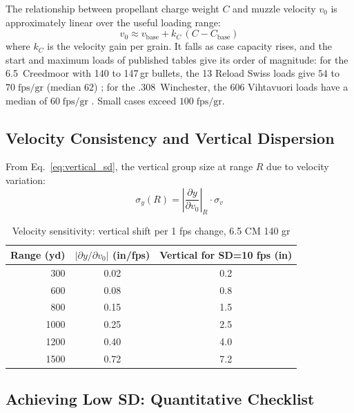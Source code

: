 \documentclass[11pt,twoside,openright]{report}
\begin{document}
The relationship between propellant charge weight $C$ and muzzle velocity $v_0$ is approximately linear over the useful loading range:
\begin{equation}
  v_0 \approx v_{\mathrm{base}} + k_C\,(C - C_{\mathrm{base}})
  \label{eq:charge_vel_linear}
\end{equation}
where $k_C$ is the velocity gain per grain. It falls as case capacity rises, and the start and maximum loads of published tables give its order of magnitude: for the 6.5~Creedmoor with 140 to 147\,gr bullets, the 13 Reload Swiss loads give $54$ to $70\;\text{fps/gr}$ (median $62$) \citep{reloadswiss2025}; for the .308~Winchester, the 606 Vihtavuori loads have a median of $60\;\text{fps/gr}$ \citep{vihtavuori2026}. Small cases exceed $100\;\text{fps/gr}$.

\subsection{Velocity Consistency and Vertical Dispersion}

From Eq.~\eqref{eq:vertical_sd}, the vertical group size at range $R$ due to velocity variation:
\begin{equation}
  \sigma_y(R) = \left|\frac{\partial y}{\partial v_0}\right|_R \cdot \sigma_v
  \label{eq:vert_disp_sv}
\end{equation}

\begin{table}[H]
\centering
\caption{Velocity sensitivity: vertical shift per 1 fps change, 6.5 CM 140 gr}
\label{tab:vel_sensitivity}
\begin{tabular}{@{}rcc@{}}
\toprule
\textbf{Range (yd)} & $|\partial y/\partial v_0|$ \textbf{(in/fps)} & \textbf{Vertical for SD=10 fps (in)} \\
\midrule
300  & 0.02 & 0.2 \\
600  & 0.08 & 0.8 \\
800  & 0.15 & 1.5 \\
1000 & 0.25 & 2.5 \\
1200 & 0.40 & 4.0 \\
1500 & 0.72 & 7.2 \\
\bottomrule
\end{tabular}
\end{table}

\subsection{Achieving Low SD: Quantitative Checklist}
\end{document}
